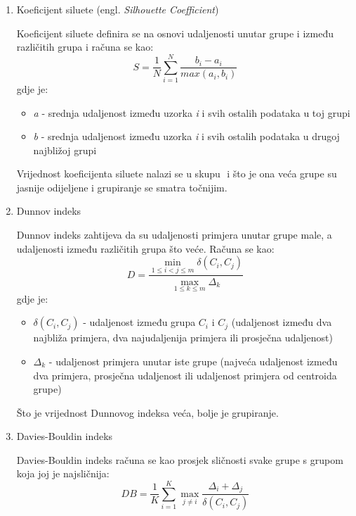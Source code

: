 \documentclass[utf8, diplomski, numeric]{fer}
\begin{document}
\begin{enumerate}
\item Koeficijent siluete (engl. \textit{Silhouette Coefficient})

Koeficijent siluete definira se na osnovi udaljenosti unutar grupe i između različitih grupa i računa se kao:
\begin{equation*} \label{eq:silouette}
S = \frac{1}{N}\sum_{i=1}^{N}\frac{b_i-a_i}{max(a_i,b_i)} 
\end{equation*}
gdje je:
\begin{itemize}
\item \textit{a} - srednja udaljenost između uzorka \textit{i} i svih ostalih podataka u toj grupi
\item \textit{b} - srednja udaljenost između uzorka \textit{i} i svih ostalih podataka u drugoj najbližoj grupi
\end{itemize}

Vrijednost koeficijenta siluete nalazi se u skupu \begin{math}[-1,1] \end{math} i što je ona veća grupe su jasnije odijeljene i grupiranje se smatra točnijim.

\item Dunnov indeks

Dunnov indeks zahtijeva da su udaljenosti primjera unutar grupe male, a udaljenosti između različitih grupa što veće. Računa se kao:
\begin{equation*} \label{eq:silouette}
D = \frac{\min_{1\leq i < j \leq m} \delta(C_i,C_j)}{\max_{1\leq k \leq m} \Delta_k}
\end{equation*}
gdje je:
\begin{itemize}
\item $\delta(C_i,C_j)$ - udaljenost između grupa $C_i$ i $C_j$ (udaljenost između dva najbliža primjera, dva najudaljenija primjera ili prosječna udaljenost)
\item $\Delta_k$ - udaljenost primjera unutar iste grupe (najveća udaljenost između dva primjera, prosječna udaljenost ili udaljenost primjera od centroida grupe)
\end{itemize}

Što je vrijednost Dunnovog indeksa veća, bolje je grupiranje.

\item Davies-Bouldin indeks

Davies-Bouldin indeks računa se kao prosjek sličnosti svake grupe s grupom koja joj je najsličnija: 
\begin{equation*} \label{eq:silouette}
DB = \frac{1}{K}\sum_{i = 1}^{K} \max_{j\neq i} \frac{\Delta_i + \Delta_j}{\delta(C_i,C_j)}
\end{equation*}


\end{enumerate}
\end{document}
